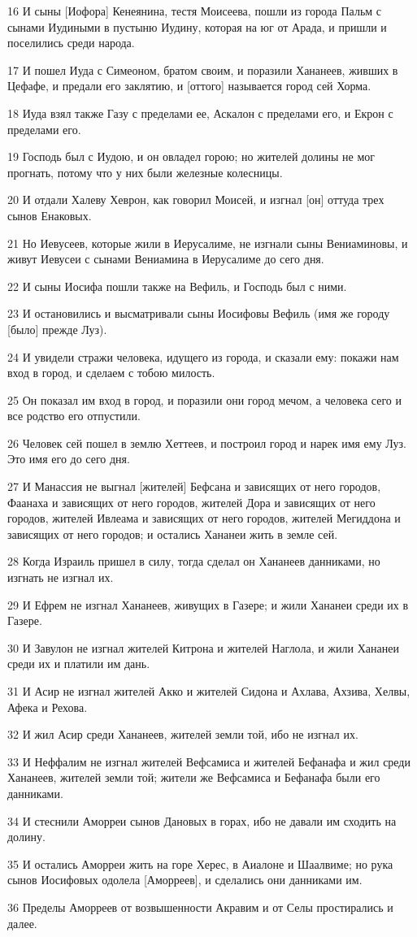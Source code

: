 \par 16 И сыны [Иофора] Кенеянина, тестя Моисеева, пошли из города Пальм с сынами Иудиными в пустыню Иудину, которая на юг от Арада, и пришли и поселились среди народа.
\par 17 И пошел Иуда с Симеоном, братом своим, и поразили Хананеев, живших в Цефафе, и предали его заклятию, и [оттого] называется город сей Хорма.
\par 18 Иуда взял также Газу с пределами ее, Аскалон с пределами его, и Екрон с пределами его.
\par 19 Господь был с Иудою, и он овладел горою; но жителей долины не мог прогнать, потому что у них были железные колесницы.
\par 20 И отдали Халеву Хеврон, как говорил Моисей, и изгнал [он] оттуда трех сынов Енаковых.
\par 21 Но Иевусеев, которые жили в Иерусалиме, не изгнали сыны Вениаминовы, и живут Иевусеи с сынами Вениамина в Иерусалиме до сего дня.
\par 22 И сыны Иосифа пошли также на Вефиль, и Господь был с ними.
\par 23 И остановились и высматривали сыны Иосифовы Вефиль (имя же городу [было] прежде Луз).
\par 24 И увидели стражи человека, идущего из города, и сказали ему: покажи нам вход в город, и сделаем с тобою милость.
\par 25 Он показал им вход в город, и поразили они город мечом, а человека сего и все родство его отпустили.
\par 26 Человек сей пошел в землю Хеттеев, и построил город и нарек имя ему Луз. Это имя его до сего дня.
\par 27 И Манассия не выгнал [жителей] Бефсана и зависящих от него городов, Фаанаха и зависящих от него городов, жителей Дора и зависящих от него городов, жителей Ивлеама и зависящих от него городов, жителей Мегиддона и зависящих от него городов; и остались Хананеи жить в земле сей.
\par 28 Когда Израиль пришел в силу, тогда сделал он Хананеев данниками, но изгнать не изгнал их.
\par 29 И Ефрем не изгнал Хананеев, живущих в Газере; и жили Хананеи среди их в Газере.
\par 30 И Завулон не изгнал жителей Китрона и жителей Наглола, и жили Хананеи среди их и платили им дань.
\par 31 И Асир не изгнал жителей Акко и жителей Сидона и Ахлава, Ахзива, Хелвы, Афека и Рехова.
\par 32 И жил Асир среди Хананеев, жителей земли той, ибо не изгнал их.
\par 33 И Неффалим не изгнал жителей Вефсамиса и жителей Бефанафа и жил среди Хананеев, жителей земли той; жители же Вефсамиса и Бефанафа были его данниками.
\par 34 И стеснили Аморреи сынов Дановых в горах, ибо не давали им сходить на долину.
\par 35 И остались Аморреи жить на горе Херес, в Аиалоне и Шаалвиме; но рука сынов Иосифовых одолела [Аморреев], и сделались они данниками им.
\par 36 Пределы Аморреев от возвышенности Акравим и от Селы простирались и далее.

